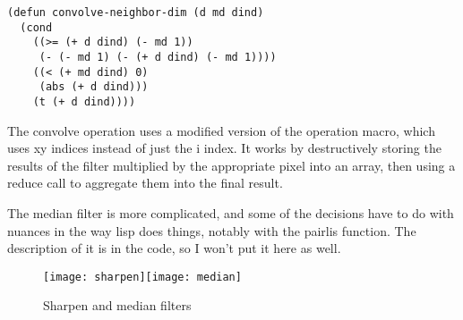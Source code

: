 \documentclass[11pt]{report}
\begin{document}
\begin{lstlisting}
(defun convolve-neighbor-dim (d md dind)
  (cond
    ((>= (+ d dind) (- md 1))
     (- (- md 1) (- (+ d dind) (- md 1))))
    ((< (+ md dind) 0)
     (abs (+ d dind)))
    (t (+ d dind))))
\end{lstlisting}

The convolve operation uses a modified version of the operation macro, which
uses xy indices instead of just the i index. It works by destructively storing
the results of the filter multiplied by the appropriate pixel into an array,
then using a reduce call to aggregate them into the final result.

The median filter is more complicated, and some of the decisions have to do
with nuances in the way lisp does things, notably with the pairlis function.
The description of it is in the code, so I won't put it here as well.

\begin{figure}[h!]
\centering
    \texttt{[image: sharpen]}\texttt{[image: median]}
\caption{Sharpen and median filters}
\end{figure}
\end{document}
